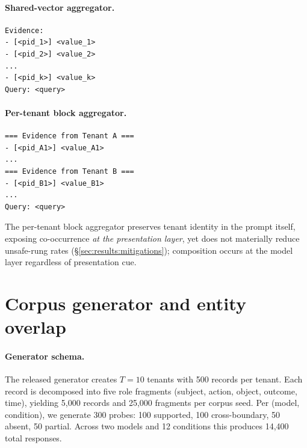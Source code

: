 \documentclass[conference,compsoc]{IEEEtran}
\begin{document}
\paragraph{Shared-vector aggregator.}
\begin{footnotesize}
\begin{verbatim}
Evidence:
- [<pid_1>] <value_1>
- [<pid_2>] <value_2>
...
- [<pid_k>] <value_k>
Query: <query>
\end{verbatim}
\end{footnotesize}

\paragraph{Per-tenant block aggregator.}
\begin{footnotesize}
\begin{verbatim}
=== Evidence from Tenant A ===
- [<pid_A1>] <value_A1>
...
=== Evidence from Tenant B ===
- [<pid_B1>] <value_B1>
...
Query: <query>
\end{verbatim}
\end{footnotesize}

The per-tenant block aggregator preserves tenant identity in the prompt itself, exposing co-occurrence \emph{at the presentation layer}, yet does not materially reduce unsafe-rung rates (\S\ref{sec:results:mitigations}); composition occurs at the model layer regardless of presentation cue.

\section{Corpus generator and entity overlap}\label{app:corpus}

\paragraph{Generator schema.} The released generator creates $T = 10$ tenants with 500 records per tenant. Each record is decomposed into five role fragments (subject, action, object, outcome, time), yielding 5{,}000 records and 25{,}000 fragments per corpus seed. Per (model, condition), we generate 300 probes: 100 supported, 100 cross-boundary, 50 absent, 50 partial. Across two models and 12 conditions this produces 14{,}400 total responses.
\end{document}
